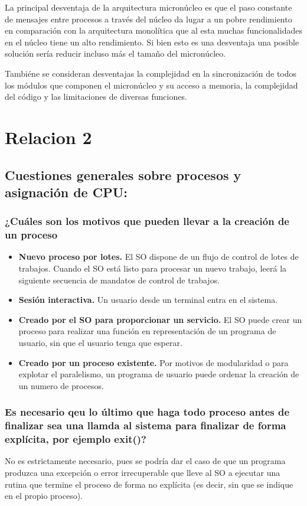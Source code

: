 \documentclass{article}
\begin{document}
					La principal desventaja de la arquitectura micronúcleo es que el paso constante de mensajes entre procesos a través del núcleo da lugar a un pobre rendimiento en comparación con la arquitectura monolítica que al esta muchas funcionalidades en el núcleo tiene un alto rendimiento. Si bien esto es una desventaja una posible solución sería reducir incluso más el tamaño del micronúcleo.
					
					Tambiéne se consideran desventajas la complejidad en la sincronización de todos los módulos que componen el micronúcleo y su acceso a memoria, la complejidad del código y las limitaciones de diversas funciones.
					
		\section{Relacion 2}
			\subsection[Pregunta 1]{Cuestiones generales sobre procesos y asignación de CPU:}
				\subsubsection*{¿Cuáles son los motivos que pueden llevar a la creación de un proceso}
					\begin{itemize}
					\item \textbf{Nuevo proceso por lotes.} El SO dispone de un flujo de control de lotes de trabajos. Cuando el SO está listo para procesar un nuevo trabajo, leerá la siguiente secuencia de mandatos de control de trabajos.
					\item \textbf{Sesión interactiva.} Un usuario desde un terminal entra en el sistema.
					\item \textbf{Creado por el SO para proporcionar un servicio.}  El SO puede crear un proceso para realizar una función en representación de un programa de usuario, sin que el usuario tenga que esperar.
					\item \textbf{Creado por un proceso existente.} Por motivos de modularidad o para explotar el paralelismo, un programa de usuario puede ordenar la creación de un numero de procesos.
					\end{itemize}
					
				\subsubsection*{Es necesario qeu lo último que haga todo proceso antes de finalizar sea una llamda al sistema para finalizar de forma explícita, por ejemplo exit()?}
					No es estrictamente necesario, pues se podría dar el caso de que un programa produzca una excepción o error irrecuperable que lleve al SO a ejecutar una rutina que termine el proceso de forma no explícita (es decir, sin que se indique en el propio proceso).
				
\end{document}
